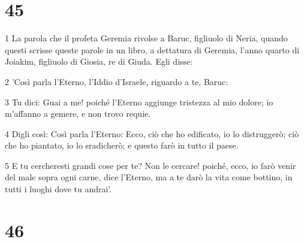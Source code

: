 \chapter{45}

\par 1 La parola che il profeta Geremia rivolse a Baruc, figliuolo di Neria, quando questi scrisse queste parole in un libro, a dettatura di Geremia, l'anno quarto di Joiakim, figliuolo di Giosia, re di Giuda. Egli disse:
\par 2 'Così parla l'Eterno, l'Iddio d'Israele, riguardo a te, Baruc:
\par 3 Tu dici: Guai a me! poiché l'Eterno aggiunge tristezza al mio dolore; io m'affanno a gemere, e non trovo requie.
\par 4 Digli così: Così parla l'Eterno: Ecco, ciò che ho edificato, io lo distruggerò; ciò che ho piantato, io lo sradicherò; e questo farò in tutto il paese.
\par 5 E tu cercheresti grandi cose per te? Non le cercare! poiché, ecco, io farò venir del male sopra ogni carne, dice l'Eterno, ma a te darò la vita come bottino, in tutti i luoghi dove tu andrai'.

\chapter{46}

